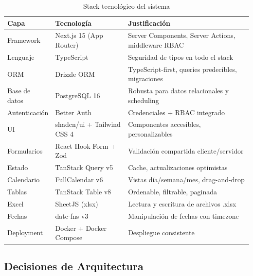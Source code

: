 \documentclass[10pt,a4paper]{article}
\begin{document}
\begin{table}[h!]
\centering
\begin{tabularx}{\textwidth}{|l|l|X|}
\hline
\textbf{Capa} & \textbf{Tecnolog\'{i}a} & \textbf{Justificaci\'{o}n} \\
\hline
Framework & Next.js 15 (App Router) & Server Components, Server Actions, middleware RBAC \\
\hline
Lenguaje & TypeScript & Seguridad de tipos en todo el stack \\
\hline
ORM & Drizzle ORM & TypeScript-first, queries predecibles, migraciones \\
\hline
Base de datos & PostgreSQL 16 & Robusta para datos relacionales y scheduling \\
\hline
Autenticaci\'{o}n & Better Auth & Credenciales + RBAC integrado \\
\hline
UI & shadcn/ui + Tailwind CSS 4 & Componentes accesibles, personalizables \\
\hline
Formularios & React Hook Form + Zod & Validaci\'{o}n compartida cliente/servidor \\
\hline
Estado & TanStack Query v5 & Cache, actualizaciones optimistas \\
\hline
Calendario & FullCalendar v6 & Vistas d\'{i}a/semana/mes, drag-and-drop \\
\hline
Tablas & TanStack Table v8 & Ordenable, filtrable, paginada \\
\hline
Excel & SheetJS (xlsx) & Lectura y escritura de archivos .xlsx \\
\hline
Fechas & date-fns v3 & Manipulaci\'{o}n de fechas con timezone \\
\hline
Deployment & Docker + Docker Compose & Despliegue consistente \\
\hline
\end{tabularx}
\caption{Stack tecnol\'{o}gico del sistema}
\end{table}

\subsection{Decisiones de Arquitectura}
\end{document}
